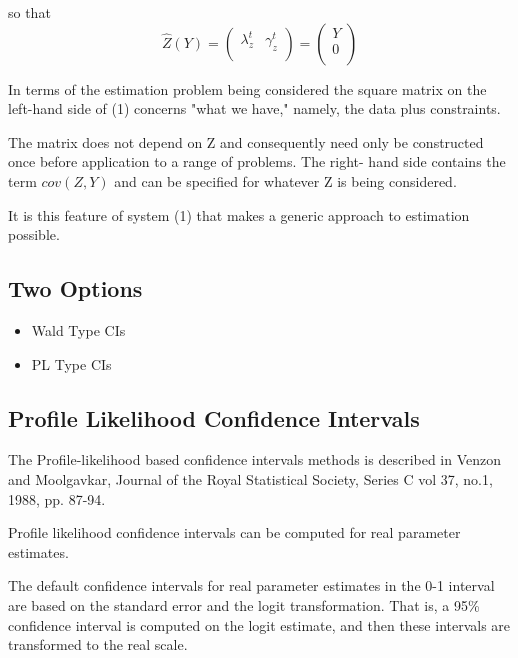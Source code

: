 \documentclass[12pt, a4paper]{report}
\begin{document}
so that
\[ \hat{Z}(Y) =
\left(
\begin{array}{cc}
\lambda_{z}^{t}&
\gamma_z^{t} \\
\end{array}
\right)=\left(
\begin{array}{c}
Y \\
0 \\
\end{array}
\right) \]

In terms of the estimation problem being considered the square matrix on the left-hand side of (1) concerns "what we have," namely, the data plus constraints.

The matrix does not depend on Z and consequently need only be constructed once before application to a range of problems. The right- hand side contains the term $cov(Z,Y)$ and can be specified for whatever Z is being considered.

It is this feature of system (1) that makes a generic approach to estimation possible.


\newpage


\subsection{Two Options }
\begin{itemize}
	\item Wald Type CIs
	\item PL Type CIs
\end{itemize}

\subsection{Profile Likelihood Confidence Intervals}
The Profile-likelihood based confidence intervals methods is described in Venzon and Moolgavkar, Journal of the Royal Statistical Society, Series C vol 37, no.1, 1988, pp. 87-94. 

Profile likelihood confidence intervals can be computed for real parameter estimates.

The default confidence intervals for real parameter estimates in the 0-1 interval are based on the standard error and the logit transformation.  
That is, a 95\% confidence interval is computed on the logit estimate, and then these intervals are transformed to the real scale.  


\newpage
\end{document}
